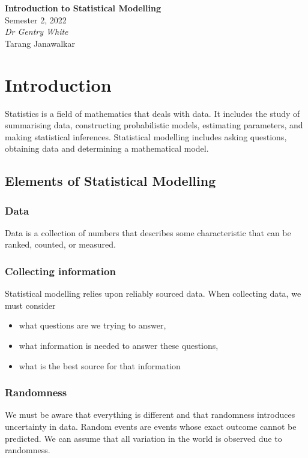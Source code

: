 \documentclass{article}
\date{}
\newcommand{\unitName}{Introduction to Statistical Modelling}
\newcommand{\unitTime}{Semester 2, 2022}
\newcommand{\unitCoordinator}{Dr Gentry White}
\newcommand{\documentAuthors}{Tarang Janawalkar}
\begin{document}
%
\begin{titlepage}
    \vspace*{\fill}
    \begin{center}
        \LARGE{\textbf{\unitName}} \\[0.1in]
        \normalsize{\unitTime} \\[0.2in]
        \normalsize\textit{\unitCoordinator} \\[0.2in]
        \documentAuthors
    \end{center}
    \vspace*{\fill}
    \doclicenseThis
    \thispagestyle{empty}
\end{titlepage}
\newpage
%
\tableofcontents
\newpage
%
\section{Introduction}
Statistics is a field of mathematics that deals with data. It includes
the study of summarising data, constructing probabilistic models,
estimating parameters, and making statistical inferences. Statistical
modelling includes asking questions, obtaining data and determining a
mathematical model.
\subsection{Elements of Statistical Modelling}
\subsubsection{Data}
Data is a collection of numbers that describes some characteristic that
can be ranked, counted, or measured.
\subsubsection{Collecting information}
Statistical modelling relies upon reliably sourced data. When
collecting data, we must consider
\begin{itemize}
    \item what questions are we trying to answer,
    \item what information is needed to answer these questions,
    \item what is the best source for that information
\end{itemize}
\subsubsection{Randomness}
We must be aware that everything is different and that randomness
introduces uncertainty in data. Random events are events whose exact
outcome cannot be predicted. We can assume that all variation in the
world is observed due to randomness.
\end{document}
